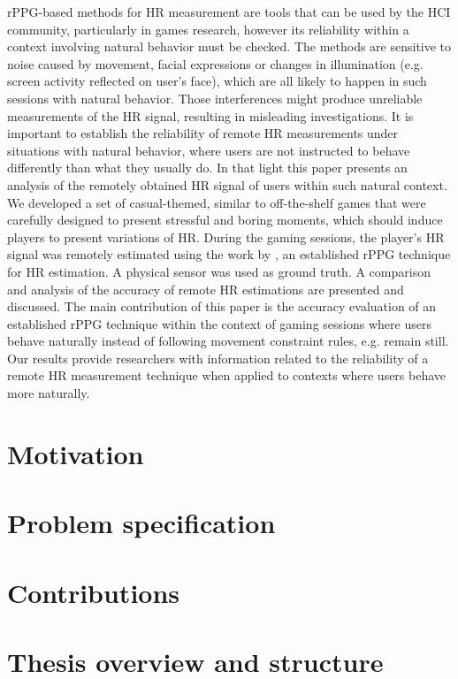 rPPG-based methods for HR measurement are tools that can be used by the HCI community, particularly in games research, however its reliability within a context involving natural behavior must be checked. The methods are sensitive to noise caused by movement, facial expressions or changes in illumination (e.g. screen activity reflected on user's face), which are all likely to happen in such sessions with natural behavior. Those interferences might produce unreliable measurements of the HR signal, resulting in misleading investigations. It is important to establish the reliability of remote HR measurements under situations with natural behavior, where users are not instructed to behave differently than what they usually do. In that light this paper presents an analysis of the remotely obtained HR signal of users within such natural context. We developed a set of casual-themed, similar to off-the-shelf games that were carefully designed to present stressful and boring moments, which should induce players to present variations of HR. During the gaming sessions, the player's HR signal was remotely estimated using the work by \textcite{poh2011advancements}, an established rPPG technique for HR estimation. A physical sensor was used as ground truth. A comparison and analysis of the accuracy of remote HR estimations are presented and discussed. The main contribution of this paper is the accuracy evaluation of an established rPPG technique within the context of gaming sessions where users behave naturally instead of following movement constraint rules, e.g. remain still. Our results provide researchers with information related to the reliability of a remote HR measurement technique when applied to contexts where users behave more naturally.

\section{Motivation}

\section{Problem specification}

\section{Contributions}

\section{Thesis overview and structure}
